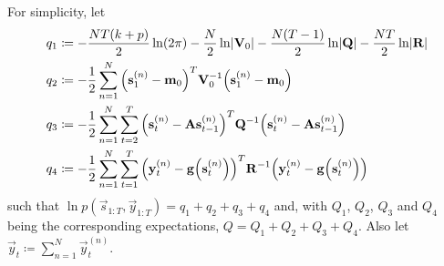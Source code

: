 For simplicity, let
\begin{align*}
	q_1 &\coloneqq -\frac{NT(k + p)}{2} \ln(2\pi) - \frac{N}{2} \ln \lvert \boldsymbol{\mathrm{V}}_0 \rvert - \frac{N(T - 1)}{2} \ln \lvert \boldsymbol{\mathrm{Q}} \rvert - \frac{NT}{2} \ln \lvert \boldsymbol{\mathrm{R}} \rvert \\
	q_2 &\coloneqq -\frac{1}{2} \sum_{n = 1}^{N} \Big( \boldsymbol{\mathrm{s}}_1^{(n)} - \boldsymbol{\mathrm{m}}_0 \Big)^T \boldsymbol{\mathrm{V}}_0^{-1} \Big( \boldsymbol{\mathrm{s}}_1^{(n)} - \boldsymbol{\mathrm{m}}_0 \Big) \\
	q_3 &\coloneqq -\frac{1}{2} \sum_{n = 1}^{N} \sum_{t = 2}^{T} \Big( \boldsymbol{\mathrm{s}}_t^{(n)} - \boldsymbol{\mathrm{A}} \boldsymbol{\mathrm{s}}_{t - 1}^{(n)} \Big)^T \boldsymbol{\mathrm{Q}}^{-1} \Big( \boldsymbol{\mathrm{s}}_t^{(n)} - \boldsymbol{\mathrm{A}} \boldsymbol{\mathrm{s}}_{t - 1}^{(n)} \Big) \\
	q_4 &\coloneqq -\frac{1}{2} \sum_{n = 1}^{N} \sum_{t = 1}^{T} \Big( \boldsymbol{\mathrm{y}}_t^{(n)} - \boldsymbol{\mathrm{g}}\Big(\boldsymbol{\mathrm{s}}_t^{(n)}\Big) \Big)^T \boldsymbol{\mathrm{R}}^{-1} \Big( \boldsymbol{\mathrm{y}}_t^{(n)} - \boldsymbol{\mathrm{g}}\Big(\boldsymbol{\mathrm{s}}_t^{(n)}\Big) \Big)
\end{align*}
such that \( \ln p(\vec{s}_{1:T}, \vec{y}_{1:T}) = q_1 + q_2 + q_3 + q_4 \) and, with \(Q_1\), \(Q_2\), \(Q_3\) and \(Q_4\) being the corresponding expectations, \( Q = Q_1 + Q_2 + Q_3 + Q_4 \). Also let \( \vec{y}_t \coloneqq \sum_{n = 1}^{N} \vec{y}_t^{(n)} \).

